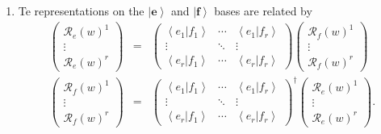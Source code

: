 \documentclass[aps,preprint]{revtex4}
\begin{document}
\begin{enumerate}
\begin{enumerate}
\item Te representations on the $\left\vert \boldsymbol{e}\right\rangle $
and $\left\vert \boldsymbol{f}\right\rangle $ bases are related by 
\begin{eqnarray}
\left( 
\begin{array}{c}
\mathcal{R}_{e}\left( w\right) ^{1} \\ 
\vdots \\ 
\mathcal{R}_{e}\left( w\right) ^{r}%
\end{array}%
\right) &=&\left( 
\begin{array}{ccc}
\left\langle \left. e_{1}\right\vert f_{1}\right\rangle & \cdots & 
\left\langle \left. e_{1}\right\vert f_{r}\right\rangle \\ 
\vdots & \ddots & \vdots \\ 
\left\langle \left. e_{r}\right\vert f_{1}\right\rangle & \cdots & 
\left\langle \left. e_{r}\right\vert f_{r}\right\rangle%
\end{array}%
\right) \left( 
\begin{array}{c}
\mathcal{R}_{f}\left( w\right) ^{1} \\ 
\vdots \\ 
\mathcal{R}_{f}\left( w\right) ^{r}%
\end{array}%
\right) \\
\left( 
\begin{array}{c}
\mathcal{R}_{f}\left( w\right) ^{1} \\ 
\vdots \\ 
\mathcal{R}_{f}\left( w\right) ^{r}%
\end{array}%
\right) &=&\left( 
\begin{array}{ccc}
\left\langle \left. e_{1}\right\vert f_{1}\right\rangle & \cdots & 
\left\langle \left. e_{1}\right\vert f_{r}\right\rangle \\ 
\vdots & \ddots & \vdots \\ 
\left\langle \left. e_{r}\right\vert f_{1}\right\rangle & \cdots & 
\left\langle \left. e_{r}\right\vert f_{r}\right\rangle%
\end{array}%
\right) ^{\dagger }\left( 
\begin{array}{c}
\mathcal{R}_{e}\left( w\right) ^{1} \\ 
\vdots \\ 
\mathcal{R}_{e}\left( w\right) ^{r}%
\end{array}%
\right) .
\end{eqnarray}
\end{enumerate}


\end{enumerate}
\end{document}
